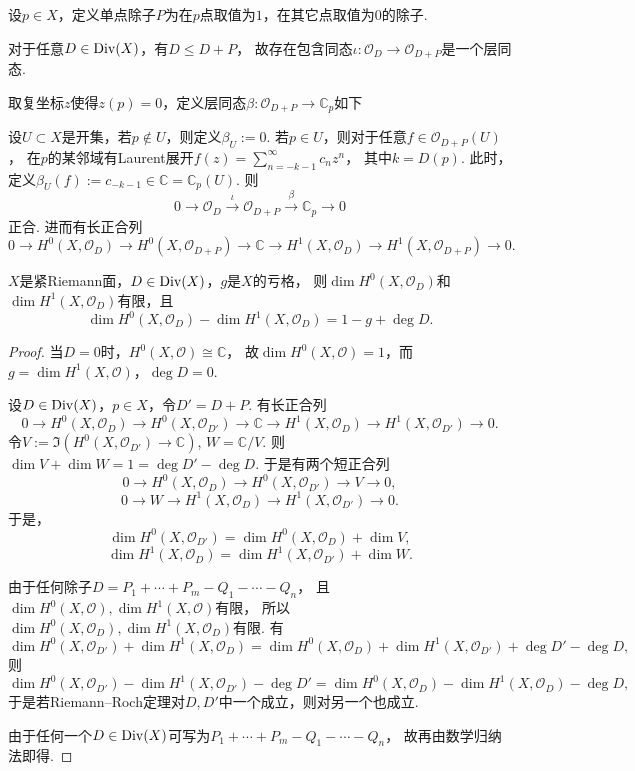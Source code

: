 \begin{definition}
	设$p \in X$，定义单点除子$P$为在$p$点取值为$1$，在其它点取值为$0$的除子.
\end{definition}

对于任意$D\in \operatorname{Div}(X)$，有$D\leq D+P$，
故存在包含同态$\iota\colon \mathcal{O}_D \rightarrow \mathcal{O}_{D+P}$是一个层同态.

取复坐标$z$使得$z(p)=0$，定义层同态$\beta\colon \mathcal{O}_{D+P}\rightarrow \mathbb{C}_p$如下

设$U\subset X$是开集，若$p\notin U$，则定义$\beta_U:=0$. 
若$p\in U$，则对于任意$f\in \mathcal{O}_{D+P}(U)$，
在$p$的某邻域有Laurent展开$f(z)=\sum\limits_{n=-k-1}^\infty c_n z^n$，
其中$k=D(p)$. 此时，定义$\beta_U(f):=c_{-k-1}\in \mathbb{C}=\mathbb{C}_p(U)$. 则
$$0\rightarrow \mathcal{O}_D \stackrel{\iota}{\longrightarrow} \mathcal{O}_{D+P} 
\stackrel{\beta}{\longrightarrow} \mathbb{C}_p \rightarrow 0$$
正合. 进而有长正合列
$$0\rightarrow H^0(X, \mathcal{O}_D) \rightarrow H^0(X, \mathcal{O}_{D+P}) 
\rightarrow \mathbb{C} \rightarrow H^1(X, \mathcal{O}_D) 
\rightarrow H^1(X, \mathcal{O}_{D+P})\rightarrow 0.$$

\begin{theorem}
	$X$是紧Riemann面，$D\in \operatorname{Div}(X)$，$g$是$X$的亏格，
    则$\dim H^0(X, \mathcal{O}_D)$和$\dim H^1(X, \mathcal{O}_D)$有限，且
	$$\dim H^0(X, \mathcal{O}_D)-\dim H^1(X, \mathcal{O}_D)=1-g+\deg D.$$
\end{theorem}

\begin{proof}
    当$D=0$时，$H^0(X, \mathcal{O})\cong \mathbb{C}$，
    故$\dim H^0(X, \mathcal{O})=1$，而$g=\dim H^1(X, \mathcal{O})$，$\deg D=0$.

	设$D\in \operatorname{Div}(X)$，$p\in X$，令$D'=D+P$. 有长正合列
	$$0\rightarrow H^0(X, \mathcal{O}_D) \rightarrow H^0(X, \mathcal{O}_{D'}) 
    \rightarrow \mathbb{C} \rightarrow H^1(X, \mathcal{O}_D) 
    \rightarrow H^1(X, \mathcal{O}_{D'})\rightarrow 0.$$
	令$V:=\Im (H^0(X, \mathcal{O}_{D'})\rightarrow \mathbb{C})$, $W=\mathbb{C}/V$. 
    则$\dim V+\dim W=1=\deg D'-\deg D$. 于是有两个短正合列
	$$0\rightarrow H^0(X, \mathcal{O}_D) \rightarrow H^0(X, \mathcal{O}_{D'}) \rightarrow V \rightarrow 0,$$
	$$0\rightarrow W \rightarrow H^1(X, \mathcal{O}_D) 
    \rightarrow H^1(X, \mathcal{O}_{D'})\rightarrow 0.$$
    于是，
	$$\dim H^0(X, \mathcal{O}_{D'})=\dim H^0(X, \mathcal{O}_D)+\dim V,$$
	$$\dim H^1(X, \mathcal{O}_D)=\dim H^1(X, \mathcal{O}_{D'})+\dim W.$$

	由于任何除子$D=P_1+\cdots+P_m-Q_1-\cdots -Q_n$，
    且$\dim H^0(X, \mathcal{O}), \dim H^1(X,\mathcal{O})$有限，
    所以$\dim H^0(X, \mathcal{O}_D), \dim H^1(X, \mathcal{O}_D)$有限. 有
	$$\dim H^0(X,\mathcal{O}_{D'})+\dim H^1(X, \mathcal{O}_D)
    = \dim H^0(X, \mathcal{O}_D)+\dim H^1(X, \mathcal{O}_{D'})+\deg D' -\deg D,$$
	则	
	$$\dim H^0(X, \mathcal{O}_{D'})-\dim H^1(X, \mathcal{O}_{D'})-\deg D'
    =\dim H^0(X, \mathcal{O}_{D})-\dim H^1(X, \mathcal{O}_{D})-\deg D,$$
	于是若Riemann--Roch定理对$D, D'$中一个成立，则对另一个也成立.

	由于任何一个$D\in \operatorname{Div}(X)$可写为$P_1+\cdots +P_m-Q_1-\cdots-Q_n$，
    故再由数学归纳法即得.
\end{proof}

